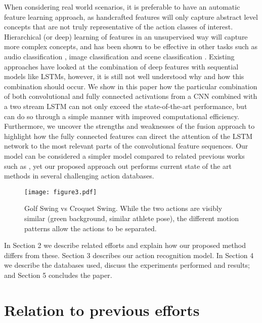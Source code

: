 \documentclass[10pt,twocolumn,letterpaper]{article}
\begin{document}
	When considering real world scenarios, it is preferable to have an automatic feature learning approach, as handcrafted features will only capture abstract level concepts that are not truly representative of the action classes of interest. Hierarchical (or deep) learning of features in an unsupervised  way will capture more complex concepts, and has been shown to be effective in other tasks such as audio classification \cite{deepaudio}, image classification \cite{deepImage1,deepImage2,deepImage3} and scene classification \cite{deepScene}. Existing approaches have looked at the combination of deep features with sequential models like LSTMs, however, it is still not well understood why and how this combination should occur. We show in this paper how the particular combination of both convolutional and fully connected activations from a CNN combined with a two stream LSTM can not only exceed the state-of-the-art performance, but can do so through a simple manner with improved computational efficiency. Furthermore, we uncover the strengths and weaknesses of the fusion approach to highlight how the fully connected features can direct the attention of the LSTM network to the most relevant parts of the convolutional feature sequences. Our model can be considered a simpler model compared to related previous works such as \cite{Simonyan2014, actiontubes, Jeff2015, Sharma2015, Yao2015}, yet our proposed approach out performs current state of the art methods in several challenging action databases.       
	
	\begin{figure}[h]
        \centering
        	\texttt{[image: figure3.pdf]}
	\caption{Golf Swing vs Croquet Swing. While the two actions are visibly similar (green background, similar athlete pose), the different motion patterns allow the actions to be separated.}
	\label{fig:fig3}
       
        \end{figure}
 	\vspace{-2 mm}
  In Section 2 we describe related efforts and explain how our proposed method differs from these. Section 3 describes our  action recognition model.  In Section 4 we describe the databases used, discuss the experiments performed and results; and Section 5 concludes the paper. 


\section{Relation to previous efforts}    
\end{document}
